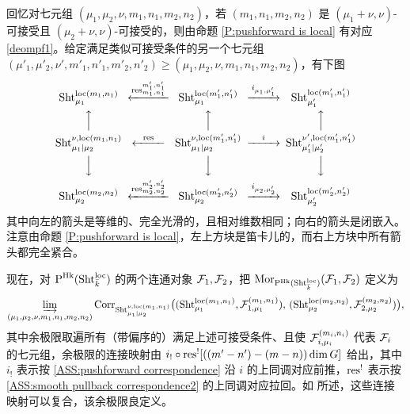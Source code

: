 回忆对七元组 $(\mu_1,\mu_2,\nu,m_1,n_1,m_2,n_2)$，若 $(m_1,n_1,m_2,n_2)$ 是 $(\mu_1+\nu,\nu)$-可接受且 $(\mu_2+\nu,\nu)$-可接受的，则由命题 \ref{P:pushforward is local} 有对应 \eqref{deompf1}。给定满足类似可接受条件的另一个七元组 $(\mu'_1,\mu'_2,\nu',m'_1,n'_1,m'_2,n'_2)\geq (\mu_1,\mu_2,\nu,m_1,n_1,m_2,n_2)$，有下图
\begin{equation*}
\label{E: loc Hecke corr changing level}
\begin{CD}
\Sht_{\mu_1}^{\loc(m_1,n_1)}@<\res^{m'_1,n'_1}_{m_1,n_1}<< \Sht_{\mu_1}^{\loc(m'_1,n'_1)}@>i_{\mu_1,\mu'_1}>> \Sht_{\mu'_1}^{\loc(m'_1,n'_1)}\\
@AAA@AAA@AAA\\
\Sht_{\mu_1\mid\mu_2}^{\nu,\loc(m_1,n_1)}@<\res<<\Sht_{\mu_1\mid\mu_2}^{\nu,\loc(m'_1,n'_1)}@>i>>\Sht_{\mu'_1\mid\mu'_2}^{\nu',\loc(m'_1,n'_1)}\\
@VVV@VVV@VVV\\
\Sht_{\mu_2}^{\loc(m_2,n_2)}@<\res^{m'_2,n'_2}_{m_2,n_2}<<\Sht_{\mu_2}^{\loc(m'_2,n'_2)}@>i_{\mu_2,\mu'_2}>>\Sht_{\mu'_2}^{\loc(m'_2,n'_2)}
\end{CD}
\end{equation*}
其中向左的箭头是等维的、完全光滑的，且相对维数相同；向右的箭头是闭嵌入。注意由命题 \ref{P:pushforward is local}，左上方块是笛卡儿的，而右上方块中所有箭头都完全紧合。

现在，对 $\operatorname{P}^{\operatorname{Hk}}(\operatorname{Sht}^{\mathrm{loc}}_{\bar k})$ 的两个连通对象 ${\mathcal F}_1,{\mathcal F}_2$，把 $\mathrm{Mor}_{\mathrm{P}^{\operatorname{Hk}}(\operatorname{Sht}^{\mathrm{loc}}_{\bar k})} (\mathcal{F}_1, \mathcal{F}_2)$ 定义为
\begin{equation*}
\label{E: hom space of PcorrSht}
\varinjlim_{(\mu_1,\mu_2,\nu,m_1,n_1,m_2,n_2)} \mathrm{Corr}_{\operatorname{Sht}_{\mu_1|\mu_2}^{\nu, \mathrm{loc}(m_1,n_1)}} \big( (\operatorname{Sht}_{\mu_1}^{\mathrm{loc}(m_1,n_1)}, \mathcal{F}_{1,\mu_1}^{(m_1,n_1)}),\,( \operatorname{Sht}_{\mu_2}^{\mathrm{loc}(m_2,n_2)},\mathcal{F}_{2,\mu_2}^{(m_2,n_2)}) \big),
\end{equation*}
其中余极限取遍所有（带偏序的）满足上述可接受条件、且使 ${\mathcal F}_{i,\mu_i}^{(m_i,n_i)}$ 代表 ${\mathcal F}_i$ 的七元组，余极限的连接映射由 $i_!\circ{\operatorname{res}}^![((m'-n')-(m-n))\dim G]$ 给出，其中 $i_!$ 表示按 \eqref{ASS:pushforward correspondence} 沿 $i$ 的上同调对应前推，${\operatorname{res}}^!$ 表示按 \eqref{ASS:smooth pullback correspondence2} 的上同调对应拉回。如 \cite[\S 5.4.1]{XZ} 所述，这些连接映射可以复合，该余极限良定义。

